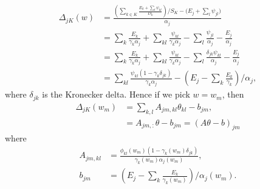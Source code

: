 \documentclass[12pt]{article}
\def\D{\displaystyle}
\begin{document}
\begin{equation}
	\label{eq:delta_split}
	\begin{split}
		\Delta_{jK}(w)&= \frac{\D \left(\sum_{k\in K} \frac{E_k + \sum_l \psi_{kl}}{D_k} \right)/ S_K - \big(E_j + \sum_l \psi_{jl}\big)}{\alpha_j} \\
		&= \sum_k \frac{E_k}{\gamma_k\alpha_j} + \sum_{kl} \frac{\psi_{kl}}{\gamma_k\alpha_j} - \sum_{l} \frac{\psi_{jl}}{\alpha_j} - \frac{E_j}{\alpha_j}\\
		&= \sum_k \frac{E_k}{\gamma_k\alpha_j} + \sum_{kl} \frac{\psi_{kl}}{\gamma_k\alpha_j} - \sum_{l} \frac{\delta_{jk}\psi_{kl}}{\alpha_j} - \frac{E_j}{\alpha_j}\\
		&= \sum_{kl} \frac{\psi_{kl} (1-\gamma_k\delta_{jk})}{\gamma_k\alpha_j} - \left(E_j - \sum_k\frac{E_k}{\gamma_k}\right)/\alpha_j,
	\end{split}
\end{equation}
where $\delta_{jk}$ is the Kronecker delta. Hence if we pick $w = w_m$, then
\begin{equation}
	\begin{split}
		\Delta_{jK}(w_m) &= \sum_{k,l} A_{jm, kl} \theta_{kl} - b_{jm}, \\
		&= A_{jm,:}\theta - b_{jm} = (A\theta - b)_{jm}
	\end{split}	
\end{equation}
where
\begin{equation}
	\begin{split}
		A_{jm, kl} &= \frac{\phi_{kl}(w_m)(1 - \gamma_k(w_m) \delta_{jk})}{\gamma_k(w_m) \alpha_j(w_m)},\\
		b_{jm} &= \left(E_j - \sum_k\frac{E_k}{\gamma_k(w_m)}\right)/\alpha_j(w_m).
	\end{split}
\end{equation}



\iffalse
&= \frac{\D \left(\sum_{k\in K} \frac{E_k + \sum_l \theta_{kl} \phi_{kl}(w)}{D_k(w)} / S_K(w)\right) - \left(E_j + \sum_l \theta_{jl} \phi_{jl}(w)\right)}{D_j(w)S_K(w)-1}, \\
\fi
\end{document}
